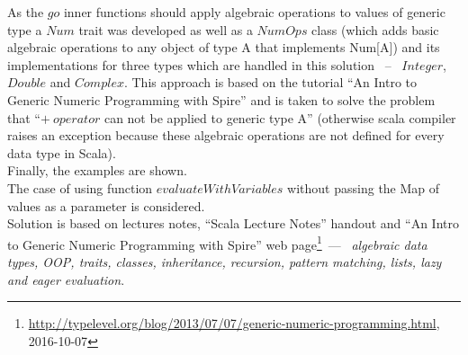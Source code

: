 \documentclass[a4paper]{article}
\begin{document}
\newline
As the $go$ inner functions should apply algebraic operations to values of generic type a $Num$ trait was developed as well as a $NumOps$ class (which adds basic algebraic operations to any object of type A that implements Num[A]) and its implementations for three types which are handled in this solution \ -- \ $Integer$, $Double$ and $Complex$. This approach is based on the tutorial ``An Intro to Generic Numeric Programming with Spire'' and is taken to solve the problem that ``$+ \ operator$ can not be applied to generic type A'' (otherwise scala compiler raises an exception because these algebraic operations are not defined for every data type in Scala). \\ 
\newline
Finally, the examples are shown. \\  
\newline
The case of using function $evaluateWithVariables$ without passing the Map of values as a parameter is considered. \\
\newline
Solution is based on lectures notes, ``Scala Lecture Notes'' handout and ``An Intro to Generic Numeric Programming with Spire'' web page\footnote[1]{\url{http://typelevel.org/blog/2013/07/07/generic-numeric-programming.html}, 2016-10-07}\ --- \ \emph{algebraic data types, OOP, traits, classes, inheritance, recursion, pattern matching, lists, lazy and eager evaluation}.  
\end{document}
